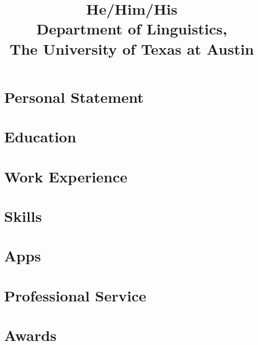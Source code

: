 \documentclass[a4paper]{practical-resume}
\title{He/Him/His\\Department of Linguistics,\\The University of Texas at Austin}
\begin{document}
\makecvtitle

\section{Personal Statement}


\section{Education}


\section{Work Experience}


\printbibliography[title=Select Publications]

\section{Skills}


\section{Apps}


\section{Professional Service}


\section{Awards}

\end{document}
